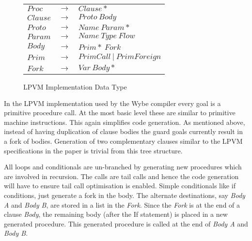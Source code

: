 \begin{figure}
\centering
\begin{tabular}{l c l}
\( Proc \)   & \( \rightarrow \) & \( Clause* \) \\
\( Clause \) & \( \rightarrow \) & \( Proto\ Body \) \\
\( Proto \)  & \( \rightarrow \) & \( Name\ Param* \) \\
\( Param \)  & \( \rightarrow \) & \( Name\ Type\ Flow \) \\
\( Body \)   & \( \rightarrow \) & \( Prim*\ Fork \) \\
\( Prim \)   & \( \rightarrow \) & \( PrimCall\ |\ PrimForeign \) \\
\( Fork \)   & \( \rightarrow \) & \( Var\ Body* \) \\
\end{tabular}
\caption{LPVM Implementation Data Type}
\end{figure}

In the LPVM implementation used by the Wybe compiler every goal is a primitive
procedure call. At the most basic level these are similar to primitive machine
instructions. This again simplifies code generation. As mentioned above,
instead of having duplication of clause bodies the guard goals currently result
in a fork of bodies. Generation of two complementary clauses similar to the
LPVM specifications in the paper is trivial from this tree structure.

All loops and conditionals are un-branched by generating new procedures which
are involved in recursion. The calls are tail calls and hence the code
generation will have to ensure tail call optimisation is enabled. Simple
conditionals like if conditions, just generate a fork in the body. The
alternate destinations, say \textit{Body A} and \textit{Body B}, are stored in a
list in the \textit{Fork}. Since the \textit{Fork} is at the end of a clause
\textit{Body}, the remaining body (after the If statement) is placed in a new
generated procedure. This generated procedure is called at the end of
\textit{Body A} and \textit{Body B}.





